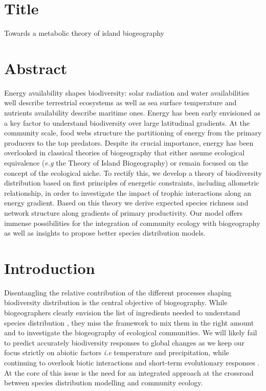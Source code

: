 \section{Title}\label{title}

Towards a metabolic theory of island biogeography

\section{Abstract}\label{abstract}

Energy availability shapes biodiversity: solar radiation and water
availabilities well describe terrestrial ecosystems as well as sea
surface temperature and nutrients availability describe maritime ones.
Energy has been early envisioned as a key factor to understand
biodiversity over large latitudinal gradients. At the community scale,
food webs structure the partitioning of energy from the primary
producers to the top predators. Despite its crucial importance, energy
has been overlooked in classical theories of biogeography that either
assume ecological equivalence (\emph{e.g} the Theory of Island
Biogeography) or remain focused on the concept of the ecological niche.
To rectify this, we develop a theory of biodiversity distribution based
on first principles of energetic constraints, including allometric
relationship, in order to investigate the impact of trophic interactions
along an energy gradient. Based on this theory we derive expected
species richness and network structure along gradients of primary
productivity. Our model offers immense possibilities for the integration
of community ecology with biogeography as well as insights to propose
better species distribution models.

\section{Introduction}\label{introduction}

Disentangling the relative contribution of the different processes
shaping biodiversity distribution is the central objective of
biogeography. While biogeographers clearly envision the list of
ingredients needed to understand species distribution
\citep{Thuiller2013}, they miss the framework to mix them in the right
amount and to investigate the biogeography of ecological communities. We
will likely fail to predict accurately biodiversity responses to global
changes as we keep our focus strictly on abiotic factors \emph{i.e}
temperature and precipitation, while continuing to overlook biotic
interactions \citep{Wiens2011} and short-term evolutionary responses
\citep{Lavergne2010}. At the core of this issue is the need for an
integrated approach at the crossroad between species distribution
modelling and community ecology.

